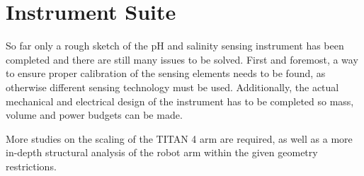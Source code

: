 \section{Instrument Suite}
	
So far only a rough sketch of the pH and salinity sensing instrument has been completed and there are still many issues to be solved. First and foremost, a way to ensure proper calibration of the sensing elements needs to be found, as otherwise different sensing technology must be used. Additionally, the actual mechanical and electrical design of the instrument has to be completed so mass, volume and power budgets can be made.


%

More studies on the scaling of the TITAN 4 arm are required, as well as a more in-depth structural analysis of the robot arm within the given geometry restrictions. 

